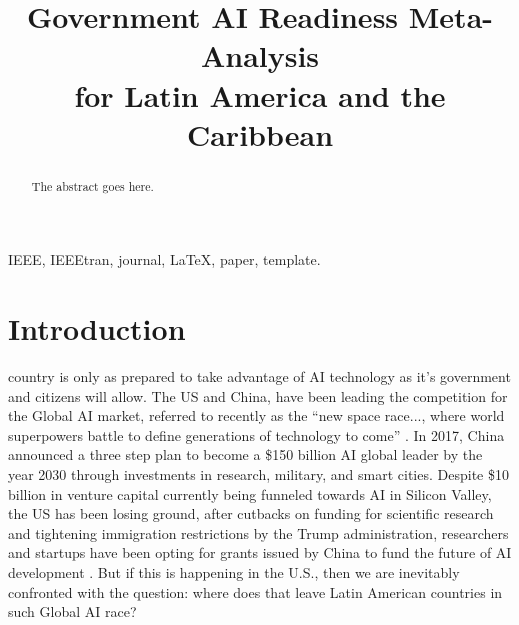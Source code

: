 \documentclass[conference]{IEEEtran}
\begin{document}
\title{Government AI Readiness Meta-Analysis\\for Latin America and the Caribbean 
}

\author{
\and
{}
}

\maketitle

\begin{abstract}
The abstract goes here.
\end{abstract}

\begin{IEEEkeywords}
IEEE, IEEEtran, journal, \LaTeX, paper, template.
\end{IEEEkeywords}



\section{Introduction}

 country is only as prepared to take advantage of AI technology as it's government and citizens will allow. The US and China, have been leading the competition for the Global AI market, referred to recently as the ``new space race..., where world superpowers battle to define generations of technology to come'' \cite{gershgorn2018ai}. In 2017, China announced a three step plan to become a \$150 billion AI global leader by the year 2030 through investments in research, military, and smart cities. Despite \$10 billion in venture capital currently being funneled towards AI in Silicon Valley, the US has been losing ground, after cutbacks on funding for scientific research and tightening immigration restrictions by the Trump administration, researchers and startups have been opting for grants issued by China to fund the future of AI development \cite{mozur2017china}. But if this is happening in the U.S., then we are inevitably confronted with the question: where does that leave Latin American countries in such Global AI race?
\end{document}

